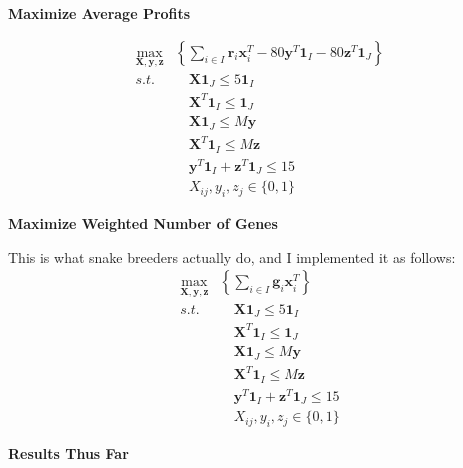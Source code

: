 \documentclass[grey,handout]{beamer}
\renewcommand{\frametitle}[1]{\begin{center}\textbf{#1}\end{center}}
\begin{document}
  \begin{frame}
    \frametitle{Maximize Average Profits}
    \begin{align*}
      \max_{\mathbf{X},\mathbf{y},\mathbf{z}}&\left\{ \sum_{i\in I}\mathbf r_i \mathbf x_i^T - 80\mathbf y^T\mathbf 1_I - 80\mathbf z^T\mathbf 1_J \right\}\\
      s.t. & \quad\mathbf X\mathbf 1_J \leq 5\mathbf 1_I \\
      &\quad \mathbf X^T \mathbf 1_I \leq \mathbf1_J\\
      &\quad \mathbf X \mathbf1_J\leq M\mathbf y\\
      & \quad\mathbf X^T\mathbf 1_I \leq M\mathbf z\\
      &\quad \mathbf y^T\mathbf 1_I + \mathbf z^T\mathbf 1_J \leq 15\\
      & \quad X_{ij}, y_i, z_j \in \{0,1\}
    \end{align*}
  \end{frame}
\begin{frame}
    \frametitle{Maximize Weighted Number of Genes}
    This is what snake breeders actually do, and I implemented it as follows:
    \begin{align*}
    \max_{\mathbf{X},\mathbf{y},\mathbf{z}}&\left\{ \sum_{i\in I} \mathbf g_i \mathbf x_i^T  \right\}\\
      s.t. & \quad\mathbf X\mathbf 1_J \leq 5\mathbf 1_I \\
      &\quad \mathbf X^T \mathbf 1_I \leq \mathbf1_J\\
      &\quad \mathbf X \mathbf1_J\leq M\mathbf y\\
      & \quad\mathbf X^T\mathbf 1_I \leq M\mathbf z\\
      &\quad \mathbf y^T\mathbf 1_I + \mathbf z^T\mathbf 1_J \leq 15\\
      & \quad X_{ij}, y_i, z_j \in \{0,1\}
    \end{align*}
\end{frame}

\begin{frame}
\frametitle{Results Thus Far}
\end{frame}
\end{document}
